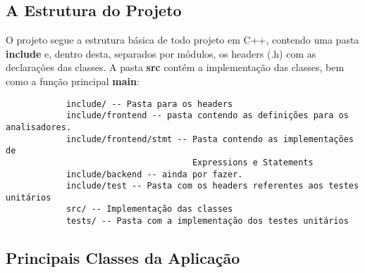 \documentclass[11pt]{article}
\begin{document}
	\subsection{A Estrutura do Projeto}
		
		O projeto segue a estrutura básica de todo projeto em C++, contendo uma pasta \textbf{include} e, dentro desta, separados por módulos, os headers (.h) com as declarações das classes. A pasta \textbf{src} contém a implementação das classes, bem como a função principal \textbf{main}:
		
		\begin{verbatim}
			include/ -- Pasta para os headers
			include/frontend -- pasta contendo as definições para os analisadores.
			include/frontend/stmt -- Pasta contendo as implementações de 
			                         Expressions e Statements
			include/backend -- ainda por fazer.
			include/test -- Pasta com os headers referentes aos testes unitários
			src/ -- Implementação das classes
			tests/ -- Pasta com a implementação dos testes unitários 
		\end{verbatim}
		
		
		
	\subsection{Principais Classes da Aplicação}
		
\end{document}
